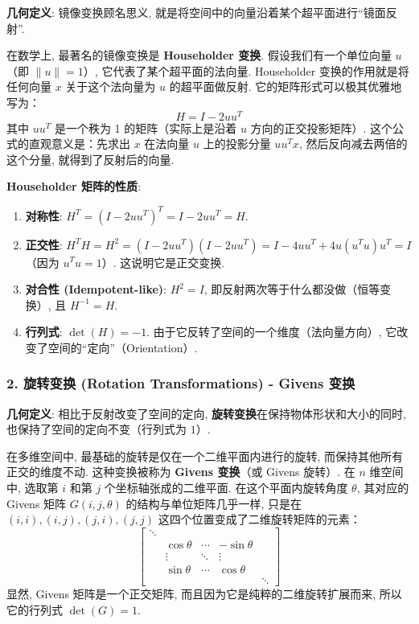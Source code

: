 \documentclass{ctexart}
\begin{document}
\textbf{几何定义}: 镜像变换顾名思义, 就是将空间中的向量沿着某个超平面进行“镜面反射”.

在数学上, 最著名的镜像变换是 \textbf{Householder 变换}. 假设我们有一个单位向量 $u$（即 $\|u\|=1$）, 它代表了某个超平面的法向量. Householder 变换的作用就是将任何向量 $x$ 关于这个法向量为 $u$ 的超平面做反射. 
它的矩阵形式可以极其优雅地写为：
$$H = I - 2uu^T$$
其中 $uu^T$ 是一个秩为 1 的矩阵（实际上是沿着 $u$ 方向的正交投影矩阵）. 这个公式的直观意义是：先求出 $x$ 在法向量 $u$ 上的投影分量 $uu^Tx$, 然后反向减去两倍的这个分量, 就得到了反射后的向量.

\textbf{Householder 矩阵的性质}:

\begin{enumerate}
    \item \textbf{对称性}: $H^T = (I - 2uu^T)^T = I - 2uu^T = H$.
    \item \textbf{正交性}: $H^T H = H^2 = (I - 2uu^T)(I - 2uu^T) = I - 4uu^T + 4u(u^Tu)u^T = I$（因为 $u^Tu=1$）. 这说明它是正交变换.
    \item \textbf{对合性 (Idempotent-like)}: $H^2 = I$, 即反射两次等于什么都没做（恒等变换）, 且 $H^{-1} = H$. 
    \item \textbf{行列式}: $\det(H) = -1$. 由于它反转了空间的一个维度（法向量方向）, 它改变了空间的“定向”（Orientation）.
\end{enumerate}

\subsubsection{2. 旋转变换 (Rotation Transformations) - Givens 变换}

\textbf{几何定义}: 相比于反射改变了空间的定向, \textbf{旋转变换}在保持物体形状和大小的同时, 也保持了空间的定向不变（行列式为 $1$）.

在多维空间中, 最基础的旋转是仅在一个二维平面内进行的旋转, 而保持其他所有正交的维度不动. 这种变换被称为 \textbf{Givens 变换}（或 Givens 旋转）. 
在 $n$ 维空间中, 选取第 $i$ 和第 $j$ 个坐标轴张成的二维平面. 在这个平面内旋转角度 $\theta$, 其对应的 Givens 矩阵 $G(i, j, \theta)$ 的结构与单位矩阵几乎一样, 只是在 $(i,i), (i,j), (j,i), (j,j)$ 这四个位置变成了二维旋转矩阵的元素：
$$
\begin{bmatrix}
\ddots & & & & \\
& \cos\theta & \cdots & -\sin\theta & \\
& \vdots & \ddots & \vdots & \\
& \sin\theta & \cdots & \cos\theta & \\
& & & & \ddots
\end{bmatrix}
$$
显然, Givens 矩阵是一个正交矩阵, 而且因为它是纯粹的二维旋转扩展而来, 所以它的行列式 $\det(G) = 1$.
\end{document}
